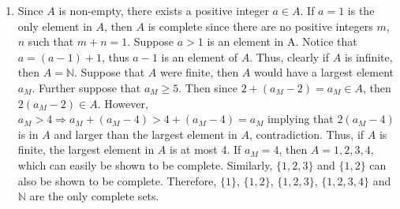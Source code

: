 \documentclass{article}
\begin{document}
\begin{enumerate}
\item Since $A$ is non-empty, there exists a positive integer $a \in A$. If $a = 1$ is the only element in $A$, then $A$ is complete since there are no positive integers $m$, $n$ such that $m + n = 1$. Suppose $a > 1$ is an element in A. Notice that $a = (a-1) + 1$, thus $a-1$ is an element of $A$. Thus, clearly if $A$ is infinite, then $A = \mathbb{N}$. Suppose that $A$ were finite, then $A$ would have a largest element $a_{M}$. Further suppose that $a_{M} \geq 5$. Then since $2 + (a_{M} - 2) = a_{M} \in A$, then $2(a_{M} - 2) \in A$. However, $a_{M} > 4 \Rightarrow  a_{M} + (a_{M}-4) > 4 + (a_{M}-4) = a_{M}$ implying that $2(a_{M} - 4)$ is in $A$ and larger than the largest element in $A$, contradiction. Thus, if $A$ is finite, the largest element in $A$ is at most 4. If $a_{M} = 4$, then $A = {1, 2,3, 4}$, which can easily be shown to be complete. Similarly, $\{1, 2, 3\}$ and $\{1, 2\}$ can also be shown to be complete.
Therefore, $\{1\}$, $\{1, 2\}$, $\{1, 2, 3\}$, $\{1, 2, 3, 4\}$ and $\mathbb{N}$ are the only complete sets.

\end{enumerate}
\end{document}
